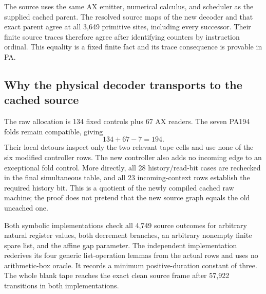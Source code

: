 The source uses the same AX emitter, numerical calculus, and scheduler
as the supplied cached parent. The resolved source maps of the new
decoder and that exact parent agree at all 3,649 primitive sites,
including every successor. Their finite source traces therefore agree
after identifying counters by instruction ordinal. This equality is a
fixed finite fact and its trace consequence is provable in PA.

\subsection{Why the physical decoder transports to the cached source}

The raw allocation is 134 fixed controls plus 67 AX readers. The seven
PA194 folds remain compatible, giving
\[
                         134+67-7=194.
\]
Their local detours inspect only the two relevant tape cells and use
none of the six modified controller rows. The new controller also adds
no incoming edge to an exceptional fold control. More directly, all
28 history/read-bit cases are rechecked in the final simultaneous table,
and all 23 incoming-context rows establish the required history bit.
This is a quotient of the newly compiled cached raw machine; the proof
does not pretend that the new source graph equals the old uncached one.

Both symbolic implementations check all 4,749 source outcomes for
arbitrary natural register values, both decrement branches, an arbitrary
nonempty finite spare list, and the affine gap parameter. The independent
implementation rederives its four generic list-operation lemmas from
the actual rows and uses no arithmetic-box oracle. It records a minimum
positive-duration constant of three. The whole blank tape reaches the
exact clean source frame after 57,922 transitions in both implementations.

